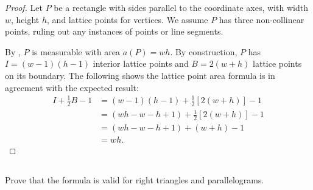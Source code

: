 \documentclass{article}
\begin{document}
\begin{proof}

  Let $P$ be a rectangle with sides parallel to the coordinate axes, with width
    $w$, height $h$, and lattice points for vertices.
  We assume $P$ has three non-collinear points, ruling out any instances of
    points or line segments.

  By , $P$ is measurable with area $a(P) = wh$.
  By construction, $P$ has $I = (w - 1)(h - 1)$ interior lattice points and
    $B = 2(w + h)$ lattice points on its boundary.
  The following shows the lattice point area formula is in agreement with
    the expected result:
    \begin{align*}
      I + \frac{1}{2}B - 1
        & = (w - 1)(h - 1) + \frac{1}{2}\left[ 2(w + h) \right] - 1 \\
        & = (wh - w - h + 1) + \frac{1}{2}\left[ 2(w + h) \right] - 1 \\
        & = (wh - w - h + 1) + (w + h) - 1 \\
        & = wh.
    \end{align*}

\end{proof}

\subsection*{}%
%

Prove that the formula is valid for right triangles and parallelograms.
\end{document}
